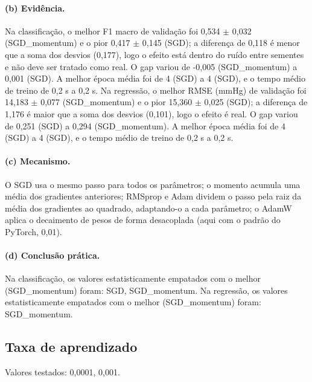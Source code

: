 \documentclass[11pt,a4paper]{article}
\begin{document}
\paragraph{(b) Evidência.} Na classificação, o melhor F1 macro de validação foi 0,534 $\pm$ 0,032 (SGD\_momentum) e o pior 0,417 $\pm$ 0,145 (SGD); a diferença de 0,118 é menor que a soma dos desvios (0,177), logo o efeito está dentro do ruído entre sementes e não deve ser tratado como real. O gap variou de -0,005 (SGD\_momentum) a 0,001 (SGD). A melhor época média foi de 4 (SGD) a 4 (SGD), e o tempo médio de treino de 0,2 s a 0,2 s. Na regressão, o melhor RMSE (mmHg) de validação foi 14,183 $\pm$ 0,077 (SGD\_momentum) e o pior 15,360 $\pm$ 0,025 (SGD); a diferença de 1,176 é maior que a soma dos desvios (0,101), logo o efeito é real. O gap variou de 0,251 (SGD) a 0,294 (SGD\_momentum). A melhor época média foi de 4 (SGD) a 4 (SGD), e o tempo médio de treino de 0,2 s a 0,2 s.

\paragraph{(c) Mecanismo.} O SGD usa o mesmo passo para todos os parâmetros; o momento acumula uma média dos gradientes anteriores; RMSprop e Adam dividem o passo pela raiz da média dos gradientes ao quadrado, adaptando-o a cada parâmetro; o AdamW aplica o decaimento de pesos de forma desacoplada (aqui com o padrão do PyTorch, 0,01).

\paragraph{(d) Conclusão prática.} Na classificação, os valores estatisticamente empatados com o melhor (SGD\_momentum) foram: SGD, SGD\_momentum.  Na regressão, os valores estatisticamente empatados com o melhor (SGD\_momentum) foram: SGD\_momentum. 

\subsection{Taxa de aprendizado}
Valores testados: 0,0001, 0,001.
\end{document}
